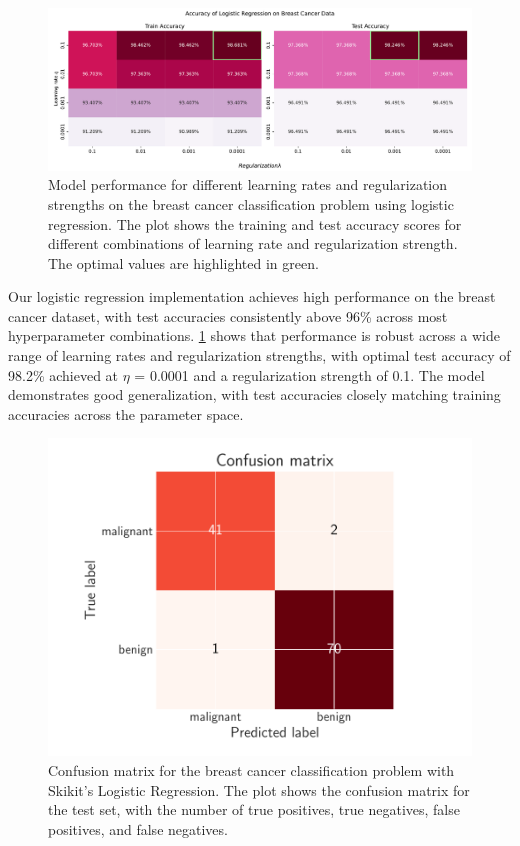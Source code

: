 \begin{figure}[h!]
    \begin{minipage}{\textwidth}
        \centering
        \includegraphics[width = .9\textwidth]{../figs/logistic_regression_gridsearch.pdf}
        \caption{Model performance for different learning rates and regularization strengths on the breast cancer classification problem using logistic regression. The plot shows the training and test accuracy scores for different combinations of learning rate and regularization strength. The optimal values are highlighted in green.}
        \label{fig:logistic_regression_gridsearch}
    \end{minipage}
\end{figure}
\twocolumngrid

Our logistic regression implementation achieves high performance on the breast cancer dataset, with test accuracies consistently above 96\% across most hyperparameter combinations. \cref{fig:logistic_regression_gridsearch} shows that performance is robust across a wide range of learning rates and regularization strengths, with optimal test accuracy of 98.2\% achieved at $\eta$ = 0.0001 and a regularization strength of 0.1. The model demonstrates good generalization, with test accuracies closely matching training accuracies across the parameter space.

\begin{figure}[h!]
    \includegraphics[width =.45\textwidth]{../figs/confusion_matrix.pdf}
    \caption{Confusion matrix for the breast cancer classification problem with Skikit's Logistic Regression. The plot shows the confusion matrix for the test set, with the number of true positives, true negatives, false positives, and false negatives.}
    \label{fig:confusion_matrix}
\end{figure}

